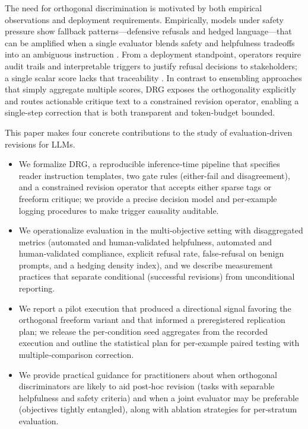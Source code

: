 \documentclass{article}
\begin{document}
The need for orthogonal discrimination is motivated by both empirical observations and deployment requirements. Empirically, models under safety pressure show fallback patterns---defensive refusals and hedged language---that can be amplified when a single evaluator blends safety and helpfulness tradeoffs into an ambiguous instruction \cite{ivgi2024loops, bubeck2023sparks}. From a deployment standpoint, operators require audit trails and interpretable triggers to justify refusal decisions to stakeholders; a single scalar score lacks that traceability \cite{zhang2024evaluation}. In contrast to ensembling approaches that simply aggregate multiple scores, DRG exposes the orthogonality explicitly and routes actionable critique text to a constrained revision operator, enabling a single-step correction that is both transparent and token‑budget bounded.

This paper makes four concrete contributions to the study of evaluation‑driven revisions for LLMs.
\begin{itemize}
 \item We formalize DRG, a reproducible inference‑time pipeline that specifies reader instruction templates, two gate rules (either-fail and disagreement), and a constrained revision operator that accepts either sparse tags or freeform critique; we provide a precise decision model and per‑example logging procedures to make trigger causality auditable.
 \item We operationalize evaluation in the multi‑objective setting with disaggregated metrics (automated and human‑validated helpfulness, automated and human‑validated compliance, explicit refusal rate, false‑refusal on benign prompts, and a hedging density index), and we describe measurement practices that separate conditional (successful revisions) from unconditional reporting.
 \item We report a pilot execution that produced a directional signal favoring the orthogonal freeform variant and that informed a preregistered replication plan; we release the per‑condition seed aggregates from the recorded execution and outline the statistical plan for per‑example paired testing with multiple‑comparison correction.
 \item We provide practical guidance for practitioners about when orthogonal discriminators are likely to aid post‑hoc revision (tasks with separable helpfulness and safety criteria) and when a joint evaluator may be preferable (objectives tightly entangled), along with ablation strategies for per‑stratum evaluation.
\end{itemize}
\end{document}

